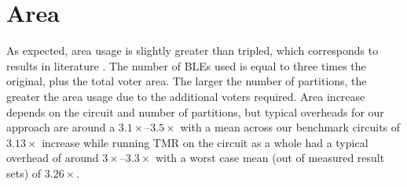 \documentclass[12pt,final,oneside]{dwThesis} %
\begin{document}
   \section{Area}
   As expected, area usage is slightly greater than tripled,
   which corresponds to results in literature \cite{HardeningTechniques}. The
   number of \glspl{BLE} used is equal to three times the original, plus the
   total voter area. The larger the number of partitions, the greater the area
   usage due to the additional voters required.
   Area increase depends on the circuit and number of partitions, but typical overheads for our approach are around a $3.1\times$--$3.5\times$ with a mean across our benchmark circuits of $3.13\times$ increase while
   running \gls{TMR} on the circuit as a whole had a typical overhead of around $3\times$--$3.3\times$ with a worst case mean (out of measured result sets) of $3.26\times$.
\end{document}
